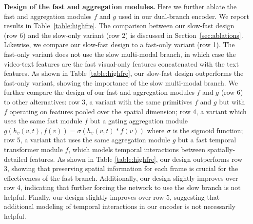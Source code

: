 \noindent \textbf{Design of the fast and aggregation modules.}\label{sec:design}
Here we further ablate the fast and aggregation modules $f$ and $g$ used in our dual-branch encoder.
We report results in Table~\ref{table:highfre}.
The comparison between our slow-fast design (row 6) and the slow-only variant (row 2) is discussed in Section~\ref{sec:ablations}.
Likewise, we compare our slow-fast design to a fast-only variant (row 1). The fast-only variant does not use the slow multi-modal branch, in which case the video-text features are the fast visual-only features concatenated with the text features.
As shown in Table \ref{table:highfre}, our slow-fast design outperforms the fast-only variant, showing the importance of the slow multi-modal branch. 
We further compare the design of our fast and aggregation modules $f$ and $g$ (row 6) to other alternatives:
row 3, a variant with the same primitives $f$ and $g$ but with $f$ operating on features pooled over the spatial dimension;
row 4, a variant which uses the same fast module $f$ but a gating aggregation module $g(h_v(v, t), f(v)) = \sigma(h_v(v, t) * f(v))$ where $\sigma$ is the sigmoid function;
row 5, a variant that uses the same aggregation module $g$ but a fast temporal transformer module $f$, which models temporal interactions between spatially-detailed features.
As shown in Table \ref{table:highfre}, our design outperforms row 3, showing that preserving spatial information for each frame is crucial for the effectiveness of the fast branch. 
Additionally, our design slightly improves over row 4, indicating that further forcing the network to use the slow branch is not helpful.
Finally, our design slightly improves over row 5, suggesting that additional modeling of temporal interactions in our encoder is not necessarily helpful.